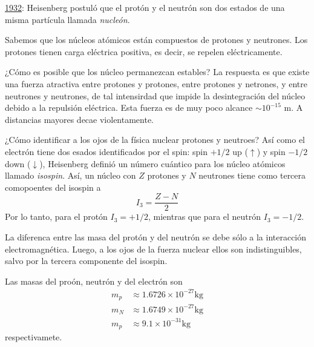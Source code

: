\underline{1932}: Heisenberg postuló que el protón y el neutrón son dos estados de una misma partícula llamada \textit{nucleón}.

Sabemos que los núcleos atómicos están compuestos de protones y neutrones. Los protones tienen carga eléctrica positiva, es decir, se repelen eléctricamente.

¿Cómo es posible que los núcleo permanezcan estables? La respuesta es que existe una fuerza atractiva entre protones y protones, entre protones y netrones, y entre neutrones y neutrones, de tal intensirdad que impide la desintegración del núcleo debido a la repulsión eléctrica. Esta fuerza es de muy poco alcance $\sim 10^{-15}$ m. A distancias mayores decae violentamente.

¿Cómo identificar a los ojos de la física nuclear protones y neutroes?
Así como el electrón tiene dos esados identificados por el spin: spin $+1/2$ up ($\uparrow$) y spin $-1/2$ down ($\downarrow$), Heisenberg definió un número cuántico para los núcleo atómicos llamado \textit{isospin}. Así, un núcleo con $Z$ protones y $N$ neutrones tiene como tercera comopoentes del isospin a
\begin{equation}
  I_3=\frac{Z-N}{2}
\end{equation}
Por lo tanto, para el protón $I_3=+1/2$, mientras que para el neutrón $I_3=-1/2$.

La diferenca entre las masa del protón y del neutrón se debe sólo a la interacción electromagnética. Luego, a los ojos de la fuerza nuclear ellos son indistinguibles, salvo por la tercera componente del isospin.

Las masas del proón, neutrón y del electrón son
\begin{align}
  m_p&\approx 1.6726\times 10^{-27} \text{kg}\\
  m_N&\approx 1.6749\times 10^{-27} \text{kg}\\
  m_p&\approx 9.1\times 10^{-31} \text{kg}
\end{align}
respectivamete.











































